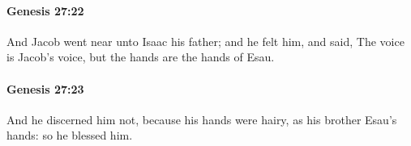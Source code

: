 		\paragraph{Genesis 27:22} %
			\label{GENESIS-27-22}

			And Jacob went near unto Isaac his father; and he felt him, and said, The voice is Jacob's voice, but the hands are the hands of Esau.


		\paragraph{Genesis 27:23} %
			\label{GENESIS-27-23}

			And he discerned him not, because his hands were hairy, as his brother Esau's hands: so he blessed him.


